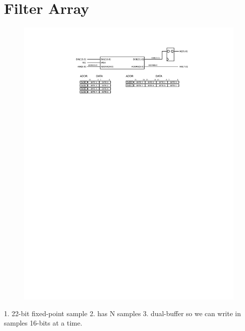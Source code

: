\section{Filter Array}

\begin{figure}
\label{filterarray}
\includegraphics[scale=1.0]{filterarray.svg}
\end{figure}

1. 22-bit fixed-point sample
2. has N samples
3. dual-buffer so we can write in samples 16-bits at a time. 

